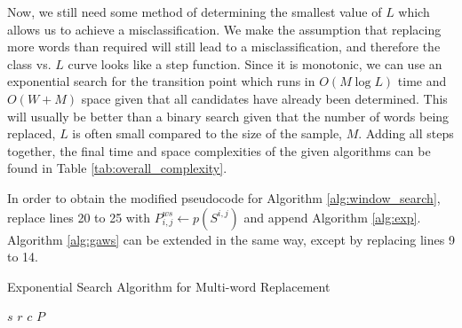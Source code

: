 Now, we still need some method of determining the smallest value of $L$ which allows us to achieve a misclassification.  We make the assumption that replacing more words than required will still lead to a misclassification, and therefore the class vs. $L$ curve looks like a step function.  Since it is monotonic, we can use an exponential search for the transition point which runs in $O(M\log L)$ time and $O(W+M)$ space given that all candidates have already been determined.  This will usually be better than a binary search given that the number of words being replaced, $L$ is often small compared to the size of the sample, $M$.  Adding all steps together, the final time and space complexities of the given algorithms can be found in Table \ref{tab:overall_complexity}.

In order to obtain the modified pseudocode for Algorithm \ref{alg:window_search}, replace lines 20 to 25 with $P^{ws}_{i,j} \gets p(S^{i,j})$ and append Algorithm \ref{alg:exp}.  Algorithm \ref{alg:gaws} can be extended in the same way, except by replacing lines 9 to 14. 

\begin{algorithm}
\begin{algorithmic}[1]
\begin{spacing}{1.0}
    \caption{Exponential Search Algorithm for Multi-word Replacement}
    \Require $s$ 
    \Require $r$ 
    \Require $c$ 
    \Require $P$ 
        \EndIf
    \EndFor\\
        \EndIf
        \EndIf
             
        \EndFor
            \EndIf
        \EndIf
    \EndWhile\\
\EndIf\\
\label{alg:exp}
\end{spacing}
\end{algorithmic}
\end{algorithm}

